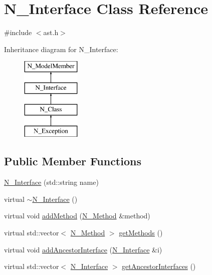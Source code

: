 \hypertarget{classN__Interface}{}\section{N\+\_\+\+Interface Class Reference}
\label{classN__Interface}


{\ttfamily \#include $<$ast.\+h$>$}

Inheritance diagram for N\+\_\+\+Interface\+:\begin{figure}[H]
\begin{center}
\leavevmode
\includegraphics[height=4.000000cm]{classN__Interface}
\end{center}
\end{figure}
\subsection*{Public Member Functions}
\begin{DoxyCompactItemize}
\item 
\hyperlink{classN__Interface_a6127252915b959e78a3c47c21ddb54f4}{N\+\_\+\+Interface} (std\+::string name)
\item 
virtual \hyperlink{classN__Interface_a3f09f32cb660660a7b03331f31a8b904}{$\sim$\+N\+\_\+\+Interface} ()
\item 
virtual void \hyperlink{classN__Interface_a4beb006efe4088bf7b243fa93935b369}{add\+Method} (\hyperlink{classN__Method}{N\+\_\+\+Method} \&method)
\item 
virtual std\+::vector$<$ \hyperlink{classN__Method}{N\+\_\+\+Method} $>$ \hyperlink{classN__Interface_af17e8ba1285e33747c37b2517178215a}{get\+Methods} ()
\item 
virtual void \hyperlink{classN__Interface_a04397ba5bc93dd83a3b601faf79768e5}{add\+Ancestor\+Interface} (\hyperlink{classN__Interface}{N\+\_\+\+Interface} \&i)
\item 
virtual std\+::vector$<$ \hyperlink{classN__Interface}{N\+\_\+\+Interface} $>$ \hyperlink{classN__Interface_a458a8c43e3b810adc68caabf3b0710fa}{get\+Ancestor\+Interfaces} ()
\end{DoxyCompactItemize}
